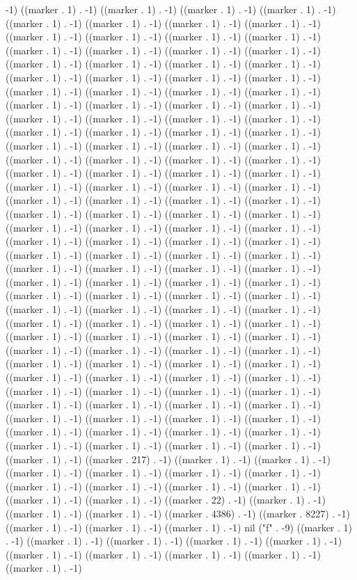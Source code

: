 -1) ((marker . 1) . -1) ((marker . 1) . -1) ((marker . 1) . -1) ((marker . 1) . -1) ((marker . 1) . -1) ((marker . 1) . -1) ((marker . 1) . -1) ((marker . 1) . -1) ((marker . 1) . -1) ((marker . 1) . -1) ((marker . 1) . -1) ((marker . 1) . -1) ((marker . 1) . -1) ((marker . 1) . -1) ((marker . 1) . -1) ((marker . 1) . -1) ((marker . 1) . -1) ((marker . 1) . -1) ((marker . 1) . -1) ((marker . 1) . -1) ((marker . 1) . -1) ((marker . 1) . -1) ((marker . 1) . -1) ((marker . 1) . -1) ((marker . 1) . -1) ((marker . 1) . -1) ((marker . 1) . -1) ((marker . 1) . -1) ((marker . 1) . -1) ((marker . 1) . -1) ((marker . 1) . -1) ((marker . 1) . -1) ((marker . 1) . -1) ((marker . 1) . -1) ((marker . 1) . -1) ((marker . 1) . -1) ((marker . 1) . -1) ((marker . 1) . -1) ((marker . 1) . -1) ((marker . 1) . -1) ((marker . 1) . -1) ((marker . 1) . -1) ((marker . 1) . -1) ((marker . 1) . -1) ((marker . 1) . -1) ((marker . 1) . -1) ((marker . 1) . -1) ((marker . 1) . -1) ((marker . 1) . -1) ((marker . 1) . -1) ((marker . 1) . -1) ((marker . 1) . -1) ((marker . 1) . -1) ((marker . 1) . -1) ((marker . 1) . -1) ((marker . 1) . -1) ((marker . 1) . -1) ((marker . 1) . -1) ((marker . 1) . -1) ((marker . 1) . -1) ((marker . 1) . -1) ((marker . 1) . -1) ((marker . 1) . -1) ((marker . 1) . -1) ((marker . 1) . -1) ((marker . 1) . -1) ((marker . 1) . -1) ((marker . 1) . -1) ((marker . 1) . -1) ((marker . 1) . -1) ((marker . 1) . -1) ((marker . 1) . -1) ((marker . 1) . -1) ((marker . 1) . -1) ((marker . 1) . -1) ((marker . 1) . -1) ((marker . 1) . -1) ((marker . 1) . -1) ((marker . 1) . -1) ((marker . 1) . -1) ((marker . 1) . -1) ((marker . 1) . -1) ((marker . 1) . -1) ((marker . 1) . -1) ((marker . 1) . -1) ((marker . 1) . -1) ((marker . 1) . -1) ((marker . 1) . -1) ((marker . 1) . -1) ((marker . 1) . -1) ((marker . 1) . -1) ((marker . 1) . -1) ((marker . 1) . -1) ((marker . 1) . -1) ((marker . 1) . -1) ((marker . 1) . -1) ((marker . 1) . -1) ((marker . 1) . -1) ((marker . 1) . -1) ((marker . 1) . -1) ((marker . 1) . -1) ((marker . 1) . -1) ((marker . 1) . -1) ((marker . 1) . -1) ((marker . 1) . -1) ((marker . 1) . -1) ((marker . 1) . -1) ((marker . 1) . -1) ((marker . 1) . -1) ((marker . 1) . -1) ((marker . 1) . -1) ((marker . 1) . -1) ((marker . 1) . -1) ((marker . 1) . -1) ((marker . 1) . -1) ((marker . 1) . -1) ((marker . 1) . -1) ((marker . 1) . -1) ((marker . 1) . -1) ((marker . 1) . -1) ((marker . 1) . -1) ((marker . 1) . -1) ((marker . 1) . -1) ((marker . 1) . -1) ((marker . 1) . -1) ((marker . 1) . -1) ((marker . 1) . -1) ((marker . 1) . -1) ((marker . 1) . -1) ((marker . 1) . -1) ((marker . 1) . -1) ((marker . 1) . -1) ((marker . 1) . -1) ((marker . 217) . -1) ((marker . 1) . -1) ((marker . 1) . -1) ((marker . 1) . -1) ((marker . 1) . -1) ((marker . 1) . -1) ((marker . 1) . -1) ((marker . 1) . -1) ((marker . 1) . -1) ((marker . 1) . -1) ((marker . 1) . -1) ((marker . 1) . -1) ((marker . 1) . -1) ((marker . 22) . -1) ((marker . 1) . -1) ((marker . 1) . -1) ((marker . 1) . -1) ((marker . 4386) . -1) ((marker . 8227) . -1) ((marker . 1) . -1) ((marker . 1) . -1) ((marker . 1) . -1) nil ("f" . -9) ((marker . 1) . -1) ((marker . 1) . -1) ((marker . 1) . -1) ((marker . 1) . -1) ((marker . 1) . -1) ((marker . 1) . -1) ((marker . 1) . -1) ((marker . 1) . -1) ((marker . 1) . -1) ((marker . 1) . -1) 